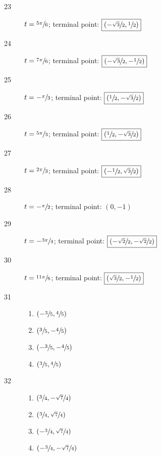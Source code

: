 \documentclass{exam}
\begin{document}
\begin{description}
      \item[23] $t = \sfrac{5 \pi}{6}$; terminal point: $\boxed{ \left( - \sfrac{\sqrt{3}}{2}, \sfrac{1}{2} \right) }$

      \item[24] $t = \sfrac{7 \pi}{6}$; terminal point: $\boxed{ \left( - \sfrac{\sqrt{3}}{2}, - \sfrac{1}{2} \right) }$

      \item[25] $t = -\sfrac{\pi}{3}$; terminal point: $\boxed{ \left( \sfrac{1}{2}, - \sfrac{\sqrt{3}}{2}  \right) }$

      \item[26] $t = \sfrac{5 \pi}{3}$; terminal point: $\boxed{ \left( \sfrac{1}{2}, - \sfrac{\sqrt{3}}{2}  \right) }$

      \item[27] $t = \sfrac{2 \pi}{3}$; terminal point: $\boxed{ \left( - \sfrac{1}{2}, \sfrac{\sqrt{3}}{2}  \right) }$

      \item[28] $t = -\sfrac{\pi}{2}$; terminal point: $\boxed{ \left( 0, -1 \right) }$

      \item[29] $t = - \sfrac{3 \pi}{4}$; terminal point: $\boxed{ \left( - \sfrac{\sqrt{2}}{2}, - \sfrac{\sqrt{2}}{2}  \right) }$
        
      \item[30] $t = \sfrac{11 \pi}{6}$; terminal point: $\boxed{ \left( \sfrac{\sqrt{3}}{2}, - \sfrac{1}{2}  \right) }$

      \item[31]
        \begin{enumerate}[a]
          \item $\left( - \sfrac{3}{5}, \sfrac{4}{5} \right)$
          \item $\left( \sfrac{3}{5}, - \sfrac{4}{5} \right)$
          \item $\left( - \sfrac{3}{5}, - \sfrac{4}{5} \right)$
          \item $\left( \sfrac{3}{5}, \sfrac{4}{5} \right)$
        \end{enumerate}

      \item[32]
        \begin{enumerate}[a]
          \item $\left( \sfrac{3}{4}, - \sfrac{\sqrt{7}}{4} \right)$
          \item $\left( \sfrac{3}{4}, \sfrac{\sqrt{7}}{4} \right)$
          \item $\left( - \sfrac{3}{4}, \sfrac{\sqrt{7}}{4} \right)$
          \item $\left( - \sfrac{3}{4}, - \sfrac{\sqrt{7}}{4} \right)$
        \end{enumerate}


\end{description}
\end{document}
